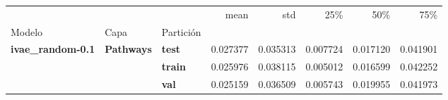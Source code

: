 \begin{tabular}{lllrrrrr}
\toprule
 &  &  & mean & std & 25\% & 50\% & 75\% \\
Modelo & Capa & Partición &  &  &  &  &  \\
\midrule
\multirow[t]{3}{*}{\textbf{ivae\_random-0.1}} & \multirow[t]{3}{*}{\textbf{Pathways}} & \textbf{test} & 0.027377 & 0.035313 & 0.007724 & 0.017120 & 0.041901 \\
\textbf{} & \textbf{} & \textbf{train} & 0.025976 & 0.038115 & 0.005012 & 0.016599 & 0.042252 \\
\textbf{} & \textbf{} & \textbf{val} & 0.025159 & 0.036509 & 0.005743 & 0.019955 & 0.041973 \\
\cline{1-8} \cline{2-8}
\bottomrule
\end{tabular}
